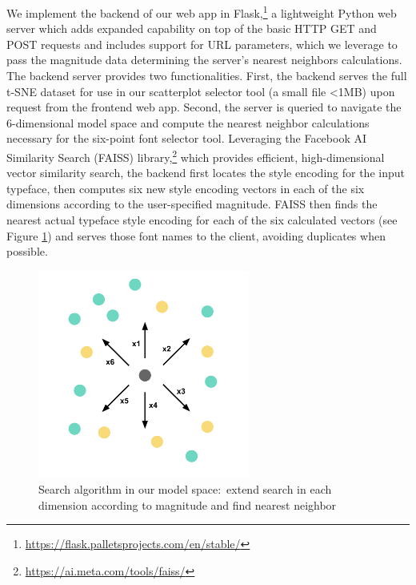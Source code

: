 We implement the backend of our web app in Flask,\footnote{\url{https://flask.palletsprojects.com/en/stable/}} a lightweight Python web server which adds expanded capability on top of the basic HTTP GET and POST requests and includes support for URL parameters, which we leverage to pass the magnitude data determining the server's nearest neighbors calculations. The backend server provides two functionalities. First, the backend serves the full t-SNE dataset for use in our scatterplot selector tool (a small file <1MB) upon request from the frontend web app. Second, the server is queried to navigate the 6-dimensional model space and compute the nearest neighbor calculations necessary for the six-point font selector tool. Leveraging the Facebook AI Similarity Search (FAISS) library,\footnote{\url{https://ai.meta.com/tools/faiss/}} which provides efficient, high-dimensional vector similarity search, the backend first locates the style encoding for the input typeface, then computes six new style encoding vectors in each of the six dimensions according to the user-specified magnitude. FAISS then finds the nearest actual typeface style encoding for each of the six calculated vectors (see Figure \ref{fig:model-search}) and serves those font names to the client, avoiding duplicates when possible.

\begin{figure}[]
    \centering
    \includegraphics[width=0.62\textwidth]{images/model-search.png}
    \caption{Search algorithm in our model space:\ extend search in each dimension according to magnitude and find nearest neighbor}
    \label{fig:model-search}
\end{figure}

